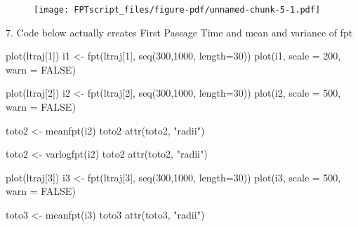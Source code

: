\documentclass[
  letterpaper,
]{book}
\newenvironment{Shaded}{\begin{snugshade}}{\end{snugshade}}
\newcommand{\AttributeTok}[1]{\textcolor[rgb]{0.40,0.45,0.13}{#1}}
\newcommand{\ConstantTok}[1]{\textcolor[rgb]{0.56,0.35,0.01}{#1}}
\newcommand{\DecValTok}[1]{\textcolor[rgb]{0.68,0.00,0.00}{#1}}
\newcommand{\FunctionTok}[1]{\textcolor[rgb]{0.28,0.35,0.67}{#1}}
\newcommand{\NormalTok}[1]{\textcolor[rgb]{0.00,0.23,0.31}{#1}}
\newcommand{\OtherTok}[1]{\textcolor[rgb]{0.00,0.23,0.31}{#1}}
\newcommand{\StringTok}[1]{\textcolor[rgb]{0.13,0.47,0.30}{#1}}
\begin{document}
\begin{figure}[H]

{\centering \texttt{[image: FPTscript\_files/figure-pdf/unnamed-chunk-5-1.pdf]}

}

\end{figure}

7. Code below actually creates First Passage Time and mean and variance
of fpt

\begin{Shaded}
\begin{Highlighting}[]
\FunctionTok{plot}\NormalTok{(ltraj[}\DecValTok{1}\NormalTok{])}
\NormalTok{i1 }\OtherTok{\textless{}{-}} \FunctionTok{fpt}\NormalTok{(ltraj[}\DecValTok{1}\NormalTok{], }\FunctionTok{seq}\NormalTok{(}\DecValTok{300}\NormalTok{,}\DecValTok{1000}\NormalTok{, }\AttributeTok{length=}\DecValTok{30}\NormalTok{))}
\FunctionTok{plot}\NormalTok{(i1, }\AttributeTok{scale =} \DecValTok{200}\NormalTok{, }\AttributeTok{warn =} \ConstantTok{FALSE}\NormalTok{)}

\FunctionTok{plot}\NormalTok{(ltraj[}\DecValTok{2}\NormalTok{])}
\NormalTok{i2 }\OtherTok{\textless{}{-}} \FunctionTok{fpt}\NormalTok{(ltraj[}\DecValTok{2}\NormalTok{], }\FunctionTok{seq}\NormalTok{(}\DecValTok{300}\NormalTok{,}\DecValTok{1000}\NormalTok{, }\AttributeTok{length=}\DecValTok{30}\NormalTok{))}
\FunctionTok{plot}\NormalTok{(i2, }\AttributeTok{scale =} \DecValTok{500}\NormalTok{, }\AttributeTok{warn =} \ConstantTok{FALSE}\NormalTok{)}

\NormalTok{toto2 }\OtherTok{\textless{}{-}} \FunctionTok{meanfpt}\NormalTok{(i2)}
\NormalTok{toto2}
\FunctionTok{attr}\NormalTok{(toto2, }\StringTok{"radii"}\NormalTok{)}

\NormalTok{toto2 }\OtherTok{\textless{}{-}} \FunctionTok{varlogfpt}\NormalTok{(i2)}
\NormalTok{toto2}
\FunctionTok{attr}\NormalTok{(toto2, }\StringTok{"radii"}\NormalTok{)}

\FunctionTok{plot}\NormalTok{(ltraj[}\DecValTok{3}\NormalTok{])}
\NormalTok{i3 }\OtherTok{\textless{}{-}} \FunctionTok{fpt}\NormalTok{(ltraj[}\DecValTok{3}\NormalTok{], }\FunctionTok{seq}\NormalTok{(}\DecValTok{300}\NormalTok{,}\DecValTok{1000}\NormalTok{, }\AttributeTok{length=}\DecValTok{30}\NormalTok{))}
\FunctionTok{plot}\NormalTok{(i3, }\AttributeTok{scale =} \DecValTok{500}\NormalTok{, }\AttributeTok{warn =} \ConstantTok{FALSE}\NormalTok{)}

\NormalTok{toto3 }\OtherTok{\textless{}{-}} \FunctionTok{meanfpt}\NormalTok{(i3)}
\NormalTok{toto3}
\FunctionTok{attr}\NormalTok{(toto3, }\StringTok{"radii"}\NormalTok{)}


\end{Highlighting}
\end{Shaded}
\end{document}
